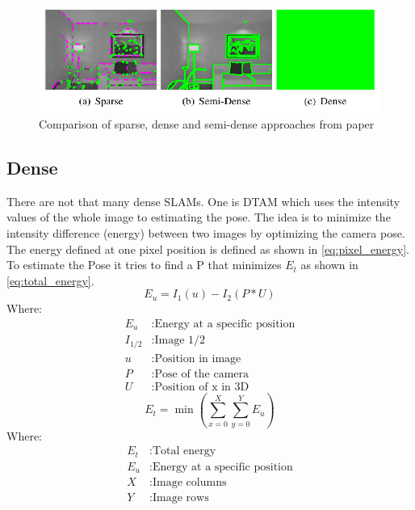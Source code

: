 \documentclass[11pt,a4paper,titlepage,oneside]{report}
\begin{document}
\begin{figure}[H]
  \begin{center}
		\includegraphics[width=1.0\textwidth]{img/sparse_dense.png}
  \end{center}
	\caption{Comparison of sparse, dense and semi-dense approaches from paper \cite{svo}}\label{fig:sparse_dense}
\end{figure}

\subsection{Dense}

There are not that many dense SLAMs. One is DTAM \cite{dtam} which uses the intensity values of the whole image to estimating the pose. The idea is to minimize the intensity difference (energy) between two images by optimizing the camera pose. The energy defined at one pixel position is defined as shown in \ref{eq:pixel_energy}. To estimate the Pose it tries to find a P that minimizes $E_{t}$ as shown in \ref{eq:total_energy}.
\begin{equation}\label{eq:pixel_energy}
  E_{u}=I_1(u)-I_2(P*U)
\end{equation}
Where:
\begin{align*}
  E_{u}		&: \text{Energy at a specific position}\\
  I_{1/2}	&: \text{Image 1/2}\\
  u		&: \text{Position in image} \\
  P		&: \text{Pose of the camera} \\
  U		&: \text{Position of x in 3D}
\end{align*}
\begin{equation}\label{eq:total_energy}
  E_{t}=\min(\sum_{x=0}^X\sum_{y=0}^YE_u)
\end{equation}
Where:
\begin{align*}
  E_{t}		&: \text{Total energy}\\
  E_{u}		&: \text{Energy at a specific position}\\
	X				&: \text{Image columns}\\
	Y				&: \text{Image rows}\\
\end{align*}
\end{document}
